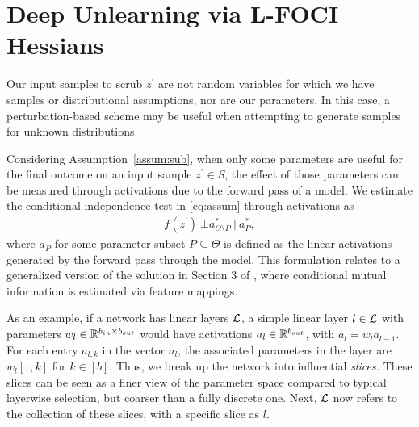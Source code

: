 \section{Deep Unlearning via L-FOCI Hessians}
\label{sec:deepunlearn}

Our input samples to scrub $z^\prime$ are not random variables for which we have samples or distributional assumptions, nor are our parameters. In this case, 
a perturbation-based scheme may be useful when attempting to generate samples for unknown distributions.

Considering Assumption~\ref{assum:sub}, when only some parameters are useful for the final outcome on an input sample $z^\prime \in S$, the effect of those parameters can be measured through activations due to the forward pass of a model. We estimate the conditional independence test in \eqref{eq:assum} through activations as
\begin{align}
    f(z^\prime)\ \bot a_{\Theta\setminus P}^*\ |\ a_P^*,
\end{align}
where $a_P$ for some parameter subset $P \subseteq \Theta$ is defined as the linear activations generated by the forward pass through the model.
This formulation relates to a generalized version of the solution in Section 3 of \cite{bullseye}, where conditional mutual information is estimated via feature mappings.

As an example, if a network has linear layers $\mathcal{L}$, a simple linear layer $l \in \mathcal{L}$ with parameters $w_l \in \mathbb{R}^{b_{in} \times b_{out}}$ would have activations $a_l \in \mathbb{R}^{b_{out}}$, with $a_l = w_l a_{l-1}$. For each entry $a_{l,k}$ in the vector $a_l$, the associated parameters in the layer are $w_l[:,k]$ for $k \in [b]$. Thus, we break up the network into influential \textit{slices.} These slices can be seen as a finer view of the parameter space compared to typical layerwise selection, but coarser than a fully discrete one. Next, $\mathcal{L}$ now refers to the collection of these slices, with a specific slice as $l$.


